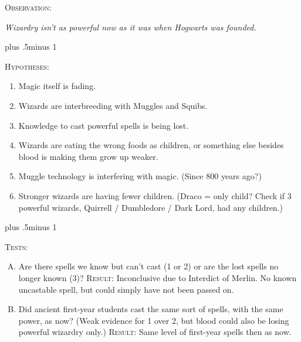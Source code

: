 \begin{centering}
\begin{samepage}
\scshape Observation:

\itshape Wizardry isn’t as powerful now as it was when Hogwarts was founded.
\end{samepage}

\baselineskip plus .5\textheight minus 1\baselineskip

\begin{samepage}
\scshape Hypotheses:

\itshape
        \begin{enumerate}[1.]
                \firmlist
                \setlength{\leftmargin}{\parindent}
                \setlength{\rightmargin}{\parindent}
        \item Magic itself is fading.
        \item Wizards are interbreeding with Muggles and Squibs.
        \item Knowledge to cast powerful spells is being lost.
        \item Wizards are eating the wrong foods as children, or something else besides blood is making them grow up weaker.
        \item Muggle technology is interfering with magic. (Since 800 years ago?)
        \item Stronger wizards are having fewer children. (Draco = only child? Check if 3 powerful wizards, Quirrell / Dumbledore / Dark Lord, had any children.)
        \end{enumerate}
\end{samepage}

\baselineskip plus .5\textheight minus 1\baselineskip

\begin{samepage}
\scshape Tests:
\itshape
        \begin{enumerate}[A.]{
                \firmlist
                \setlength{\leftmargin}{\parindent}
                \setlength{\rightmargin}{1cm}}
        \item Are there spells we know but can't cast (1 or 2) or are the lost spells no longer known (3)? {\scshape Result:} Inconclusive due to Interdict of Merlin. No known uncastable spell, but could simply have not been passed on.

        \item Did ancient first-year students cast the same sort of spells, with the same power, as now? (Weak evidence for 1 over 2, but blood could also be losing powerful wizardry only.) {\scshape Result:} Same level of first-year spells then as now.


\end{enumerate}
\end{samepage}
\end{centering}
